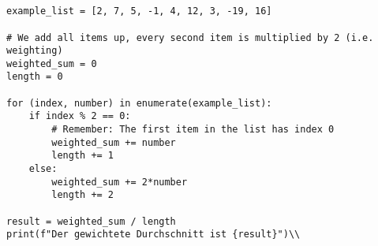 \documentclass[a4paper]{article}
\begin{document}




\section{}
\begin{verbatim}
example_list = [2, 7, 5, -1, 4, 12, 3, -19, 16]

# We add all items up, every second item is multiplied by 2 (i.e. weighting)
weighted_sum = 0
length = 0

for (index, number) in enumerate(example_list):
    if index % 2 == 0:
        # Remember: The first item in the list has index 0
        weighted_sum += number
        length += 1
    else:
        weighted_sum += 2*number
        length += 2

result = weighted_sum / length
print(f"Der gewichtete Durchschnitt ist {result}")\\
\end{verbatim}
\end{document}
